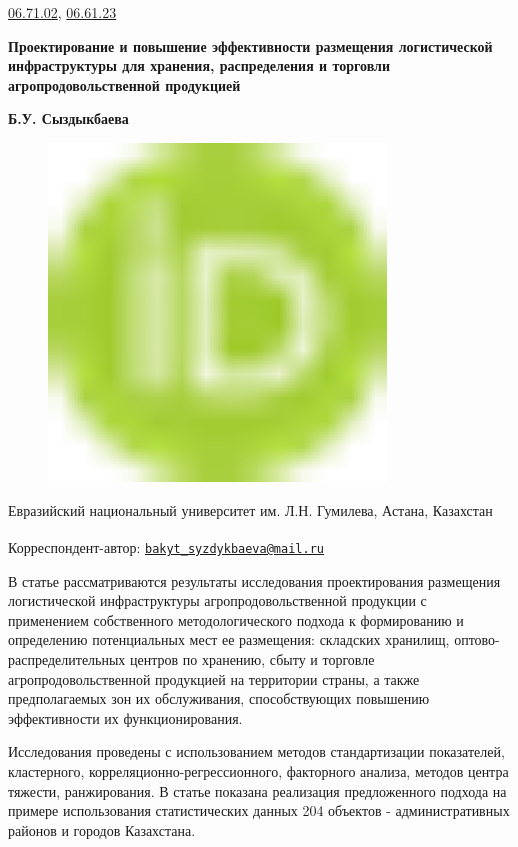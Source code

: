 \href{https://grnti.ru/?p1=06&p2=71&p3=02}{06.71.02},
\href{https://grnti.ru/?p1=06&p2=61&p3=23}{06.61.23}

{\bfseries Проектирование и повышение эффективности размещения
логистической инфраструктуры для хранения, распределения и торговли
агропродовольственной продукцией}

{\bfseries Б.У. Сыздыкбаева}

\begin{figure}[H]
	\centering
	\includegraphics[width=0.8\textwidth]{media/ekon2/image1}
	\caption*{}
\end{figure}


Евразийский национальный университет им. Л.Н. Гумилева, Астана,
Казахстан

{\bfseries \textsuperscript{\envelope }}Корреспондент-автор:
\href{mailto:bakyt_syzdykbaeva@mail.ru}{\nolinkurl{bakyt\_syzdykbaeva@mail.ru}}

В статье рассматриваются результаты исследования проектирования
размещения логистической инфраструктуры агропродовольственной продукции
с применением собственного методологического подхода к формированию и
определению потенциальных мест ее размещения: складских хранилищ,
оптово-распределительных центров по хранению, сбыту и торговле
агропродовольственной продукцией на территории страны, а также
предполагаемых зон их обслуживания, способствующих повышению
эффективности их функционирования.

Исследования проведены с использованием методов стандартизации
показателей, кластерного, корреляционно-регрессионного, факторного
анализа, методов центра тяжести, ранжирования. В статье показана
реализация предложенного подхода на примере использования статистических
данных 204 объектов - административных районов и городов Казахстана.

